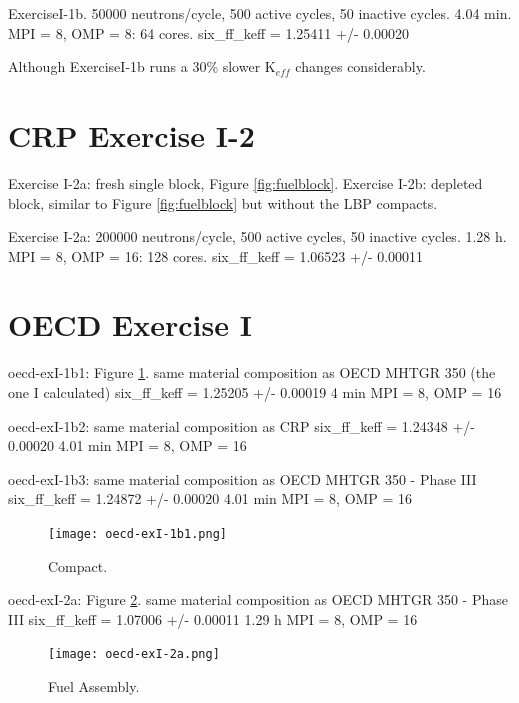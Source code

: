 \documentclass[11pt,letterpaper]{article}
\begin{document}


ExerciseI-1b. 
50000 neutrons/cycle, 500 active cycles, 50 inactive cycles.
4.04 min. MPI = 8, OMP = 8: 64 cores.
six_ff_keff = 1.25411 +/- 0.00020

Although ExerciseI-1b runs a 30\% slower K$_{eff}$ changes considerably.

\section{CRP Exercise I-2}

Exercise I-2a: fresh single block, Figure \ref{fig:fuelblock}.
Exercise I-2b: depleted block, similar to Figure \ref{fig:fuelblock} but without the LBP compacts.

Exercise I-2a:
200000 neutrons/cycle, 500 active cycles, 50 inactive cycles.
1.28 h. MPI = 8, OMP = 16: 128 cores.
six_ff_keff = 1.06523 +/- 0.00011

\section{OECD Exercise I}

oecd-exI-1b1: Figure \ref{fig:compact}.
same material composition as OECD MHTGR 350 (the one I calculated)
six_ff_keff = 1.25205 +/- 0.00019
4 min MPI = 8, OMP = 16

oecd-exI-1b2:
same material composition as CRP
six_ff_keff = 1.24348 +/- 0.00020
4.01 min MPI = 8, OMP = 16

oecd-exI-1b3:
same material composition as OECD MHTGR 350 - Phase III
six_ff_keff = 1.24872 +/- 0.00020
4.01 min MPI = 8, OMP = 16

\begin{figure}[htbp!]
	\centering
	\texttt{[image: oecd-exI-1b1.png]}
	\caption{Compact.}
	\label{fig:compact}
\end{figure}

oecd-exI-2a: Figure \ref{fig:assembly}.
same material composition as OECD MHTGR 350 - Phase III
six_ff_keff = 1.07006 +/- 0.00011
1.29 h MPI = 8, OMP = 16

\begin{figure}[htbp!]
	\centering
	\texttt{[image: oecd-exI-2a.png]}
	\caption{Fuel Assembly.}
	\label{fig:assembly}
\end{figure}
\end{document}
